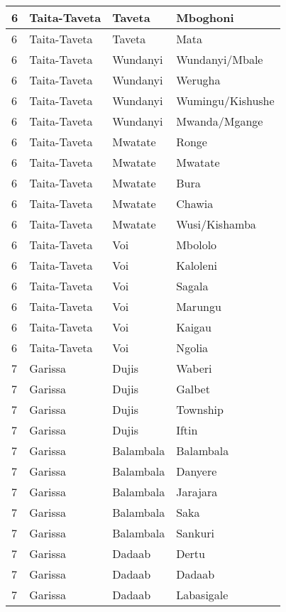 \begin{table}[!ht]
\begin{tabular}{|l|l|l|l|}
        6 & Taita-Taveta & Taveta & Mboghoni \\ \hline
        6 & Taita-Taveta & Taveta & Mata \\ \hline
        6 & Taita-Taveta & Wundanyi & Wundanyi/Mbale \\ \hline
        6 & Taita-Taveta & Wundanyi & Werugha \\ \hline
        6 & Taita-Taveta & Wundanyi & Wumingu/Kishushe \\ \hline
        6 & Taita-Taveta & Wundanyi & Mwanda/Mgange \\ \hline
        6 & Taita-Taveta & Mwatate & Ronge \\ \hline
        6 & Taita-Taveta & Mwatate & Mwatate \\ \hline
        6 & Taita-Taveta & Mwatate & Bura \\ \hline
        6 & Taita-Taveta & Mwatate & Chawia \\ \hline
        6 & Taita-Taveta & Mwatate & Wusi/Kishamba \\ \hline
        6 & Taita-Taveta & Voi & Mbololo \\ \hline
        6 & Taita-Taveta & Voi & Kaloleni \\ \hline
        6 & Taita-Taveta & Voi & Sagala \\ \hline
        6 & Taita-Taveta & Voi & Marungu \\ \hline
        6 & Taita-Taveta & Voi & Kaigau \\ \hline
        6 & Taita-Taveta & Voi & Ngolia \\ \hline
        7 & Garissa & Dujis & Waberi \\ \hline
        7 & Garissa & Dujis & Galbet \\ \hline
        7 & Garissa & Dujis & Township \\ \hline
        7 & Garissa & Dujis & Iftin \\ \hline
        7 & Garissa & Balambala & Balambala \\ \hline
        7 & Garissa & Balambala & Danyere \\ \hline
        7 & Garissa & Balambala & Jarajara \\ \hline
        7 & Garissa & Balambala & Saka \\ \hline
        7 & Garissa & Balambala & Sankuri \\ \hline
        7 & Garissa & Dadaab & Dertu \\ \hline
        7 & Garissa & Dadaab & Dadaab \\ \hline
        7 & Garissa & Dadaab & Labasigale \\ \hline

\end{tabular}
\end{table}

